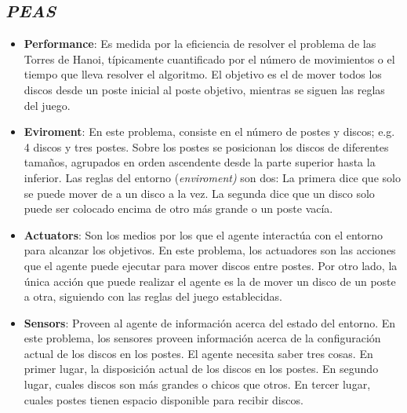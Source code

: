 \documentclass[a4paper,11pt]{article}
\begin{document}
\subsection{\textit{PEAS}}
\begin{itemize}
    \item \textbf{Performance}: Es medida por la eficiencia de resolver el problema de las Torres de Hanoi, típicamente cuantificado por el número de movimientos o el tiempo que lleva resolver el algoritmo. El objetivo es el de mover todos los discos desde un poste inicial al poste objetivo, mientras se siguen las reglas del juego.
    \item \textbf{Eviroment}: En este problema, consiste en el número de postes y discos; e.g. 4 discos y tres postes. Sobre los postes se posicionan los discos de diferentes tamaños, agrupados en orden ascendente desde la parte superior hasta la inferior. Las reglas del entorno (\textit{enviroment)} son dos: La primera dice que solo se puede mover de a un disco a la vez. La segunda dice que un disco solo puede ser colocado encima de otro más grande o un poste vacía.
    \item \textbf{Actuators}: Son los medios por los que el agente interactúa con el entorno para alcanzar los objetivos. En este problema, los actuadores son las acciones que el agente puede ejecutar para mover discos entre postes. Por otro lado, la única acción que puede realizar el agente es la de mover un disco de un poste a otra, siguiendo con las reglas del juego establecidas.
    \item \textbf{Sensors}: Proveen al agente de información acerca del estado del entorno. En este problema, los sensores proveen información acerca de la configuración actual de los discos en los postes. El agente necesita saber tres cosas. En primer lugar, la disposición actual de los discos en los postes. En segundo lugar, cuales discos son más grandes o chicos que otros. En tercer lugar, cuales postes tienen espacio disponible para recibir discos.
\end{itemize}
\end{document}
